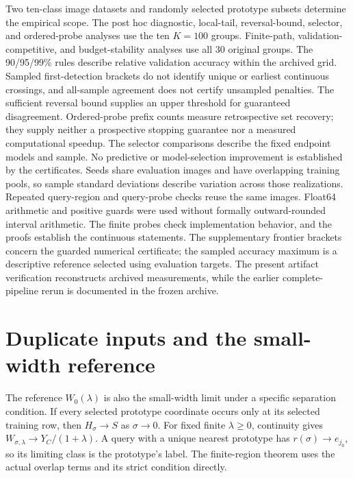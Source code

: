 \documentclass[preprint,12pt,authoryear]{elsarticle}
\begin{document}
Two ten-class image datasets and randomly selected prototype subsets determine the empirical scope. The post hoc diagnostic, local-tail, reversal-bound, selector, and ordered-probe analyses use the ten $K=100$ groups. Finite-path, validation-competitive, and budget-stability analyses use all 30 original groups. The 90/95/99\% rules describe relative validation accuracy within the archived grid. Sampled first-detection brackets do not identify unique or earliest continuous crossings, and all-sample agreement does not certify unsampled penalties. The sufficient reversal bound supplies an upper threshold for guaranteed disagreement. Ordered-probe prefix counts measure retrospective set recovery; they supply neither a prospective stopping guarantee nor a measured computational speedup. The selector comparisons describe the fixed endpoint models and sample. No predictive or model-selection improvement is established by the certificates. Seeds share evaluation images and have overlapping training pools, so sample standard deviations describe variation across those realizations. Repeated query-region and query-probe checks reuse the same images. Float64 arithmetic and positive guards were used without formally outward-rounded interval arithmetic. The finite probes check implementation behavior, and the proofs establish the continuous statements. The supplementary frontier brackets concern the guarded numerical certificate; the sampled accuracy maximum is a descriptive reference selected using evaluation targets. The present artifact verification reconstructs archived measurements, while the earlier complete-pipeline rerun is documented in the frozen archive.

\appendix
\section{Duplicate inputs and the small-width reference}
\label{app:duplicates}
The reference $W_0(\lambda)$ is also the small-width limit under a specific separation condition. If every selected prototype coordinate occurs only at its selected training row, then $H_\sigma\to S$ as $\sigma\to0$. For fixed finite $\lambda\geq0$, continuity gives $W_{\sigma,\lambda}\to Y_C/(1+\lambda)$. A query with a unique nearest prototype has $r(\sigma)\to e_{j_0}$, so its limiting class is the prototype's label. The finite-region theorem uses the actual overlap terms and its strict condition directly.
\end{document}
